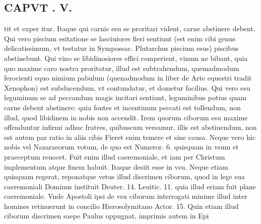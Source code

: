 \documentclass{article}
\begin{document}
\begin{pages}
\section*{CAPVT . V. }
\marginpar{[ p.377 ]}\pstart tit et exper itur. Itaque qui carnis esu se proritari vident, carne abstinere debent. Qui vero piscium esitatione se lasciuiores fieri sentiunt (est enim cibi genus delicatissimum, vt testatur in Sympossac. Plutarchus piscium esus) piscibus abstinebunt. Qui vino se libidinosiores effici comperient, vinum ne bibant, quia quo maxime caro nostra proritatur, illud est subtrahendum, quemadmodum ferocienti equo nimium pabulum (quenadmodum in liber  de Arte equestri tradit Xenophon) est subducendum, vt contundatur, et dometur facilius. Qui vero esu leguminum se ad peccandum magis incitari sentiunt, leguminibus potius quam carne debent abstinere: quia fontes et incentiuum peccati est tollendum, non illud, quod libidinem in nobis non accendit. Irem quorum ciborum esu maxime offenduntur infirmi adhuc fratres, quibuscum versamur, illis est abstinendum, non est autem par ratio in aliis cibis Fieret enim temere et sine causa. Neque vero hic nobis vel Nazaraeorum votum, de quo est Numeror. 6. quisquam in vsum et praeceptum reuocet. Fuit enim illud caeremoniale, et iam per Christum implementum atque finem habuit. Itaque desiit esse in vsu. Neque etiam quisquam regerat, reponatque vetus illud discrimen ciborum, quod in lege sua caeremoniali Dominus instituit Deuter. 14. Leuitic. 11. quia illud eriam fuit plane caeremoniale. Vnde Apostoli ipsi de vsu ciborum interrogati minime illud inter homines retinuerunt in concilio Hierosolymitano Actor. 15. Quin etiam illud ciborum discrimen saepe Paulus oppugnat, imprimis autem in Epi\pend

\end{pages}
\end{document}
